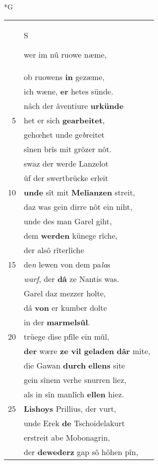 \documentclass[8pt,a4paper,notitlepage]{article}
\begin{document}
\newpage
\begin{table}[ht]
\begin{minipage}[t]{0.5\linewidth}
\small
\begin{center}*G
\end{center}
\begin{tabular}{rl}
 & \begin{large}S\end{large}wer im nû ruowe næme,\\ 
 & ob ruowens \textbf{in} gezæme,\\ 
 & ich wæne, \textbf{er} hetes sünde.\\ 
 & nâch der âventiure \textbf{urkünde}\\ 
5 & het er sich \textbf{gearbeitet},\\ 
 & gehœhet unde ge\textit{b}reitet\\ 
 & sînen brîs mit grôzer nôt.\\ 
 & swaz der werde Lanzelot\\ 
 & ûf der swertbrücke erleit\\ 
10 & \textbf{unde} sît mit \textbf{Melianzen} streit,\\ 
 & daz was gein dirre nôt ein niht,\\ 
 & unde des man Garel giht,\\ 
 & dem \textbf{werden} künege rîche,\\ 
 & der alsô rîterlîche\\ 
15 & de\textit{n} lewen von dem pa\textit{la}s\\ 
 & \textit{warf}, der \textbf{dâ} ze Nantis was.\\ 
 & Garel daz mezzer holte,\\ 
 & dâ \textbf{von} er kumber dolte\\ 
 & in der \textbf{marmelsûl}.\\ 
20 & trüege dise pfîle ein mûl,\\ 
 & \textbf{der} wære \textbf{ze vil geladen} \textbf{dâr} mite,\\ 
 & die Gawan \textbf{durch} \textbf{ellens} site\\ 
 & gein sînem verhe snurren liez,\\ 
 & als in sîn manlîch \textbf{ellen} hiez.\\ 
25 & \textbf{Lishoys} Prillius, der vurt,\\ 
 & unde Erek \textbf{de} Tschoidelakurt\\ 
 & erstreit abe Mobonagrin,\\ 
 & der \textbf{dewederz} gap sô hôhen pîn,\\ 

\end{tabular}
\end{minipage}
\end{table}
\end{document}
